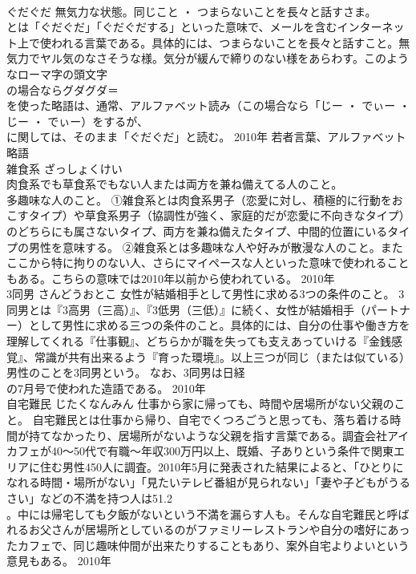 \documentclass[8pt]{extreport}
\begin{document}
\begin{CJK}{UTF8}{min}
\\	ぐだぐだ	無気力な状態。同じこと ・ つまらないことを長々と話すさま。	
\\	とは「ぐだぐだ」「ぐだぐだする」といった意味で、メールを含むインターネット上で使われる言葉である。具体的には、つまらないことを長々と話すこと。無気力でヤル気のなさそうな様。気分が緩んで締りのない様をあらわす。このようなローマ字の頭文字
\\	の場合ならグダグダ＝
\\	を使った略語は、通常、アルファベット読み（この場合なら「じー ・ でぃー ・ じー ・ でぃー）をするが、
\\	に関しては、そのまま「ぐだぐだ」と読む。	2010年	若者言葉、アルファベット略語	
\\	雑食系	ざっしょくけい	
\\	肉食系でも草食系でもない人または両方を兼ね備えてる人のこと。 
\\	多趣味な人のこと。	①雑食系とは肉食系男子（恋愛に対し、積極的に行動をおこすタイプ）や草食系男子（協調性が強く、家庭的だが恋愛に不向きなタイプ）のどちらにも属さないタイプ、両方を兼ね備えたタイプ、中間的位置にいるタイプの男性を意味する。 ②雑食系とは多趣味な人や好みが散漫な人のこと。またここから特に拘りのない人、さらにマイペースな人といった意味で使われることもある。こちらの意味では2010年以前から使われている。	2010年	
\\	3同男	さんどうおとこ	女性が結婚相手として男性に求める3つの条件のこと。	3同男とは『3高男（三高）』、『3低男（三低）』に続く、女性が結婚相手（パートナー）として男性に求める三つの条件のこと。具体的には、自分の仕事や働き方を理解してくれる『仕事観』、どちらかが職を失っても支えあっていける『金銭感覚』、常識が共有出来るよう『育った環境』。以上三つが同じ（または似ている）男性のことを3同男という。 なお、3同男は日経
\\	の7月号で使われた造語である。	2010年	
\\	自宅難民	じたくなんみん	仕事から家に帰っても、時間や居場所がない父親のこと。	自宅難民とは仕事から帰り、自宅でくつろごうと思っても、落ち着ける時間が持てなかったり、居場所がないような父親を指す言葉である。調査会社アイカフェが40～50代で有職～年収300万円以上、既婚、子ありという条件で関東エリアに住む男性450人に調査。2010年5月に発表された結果によると、「ひとりになれる時間・場所がない」「見たいテレビ番組が見られない」「妻や子どもがうるさい」などの不満を持つ人は51.2
\\	。中には帰宅しても夕飯がないという不満を漏らす人も。そんな自宅難民と呼ばれるお父さんが居場所としているのがファミリーレストランや自分の嗜好にあったカフェで、同じ趣味仲間が出来たりすることもあり、案外自宅よりよいという意見もある。	2010年	

\end{CJK}
\end{document}
